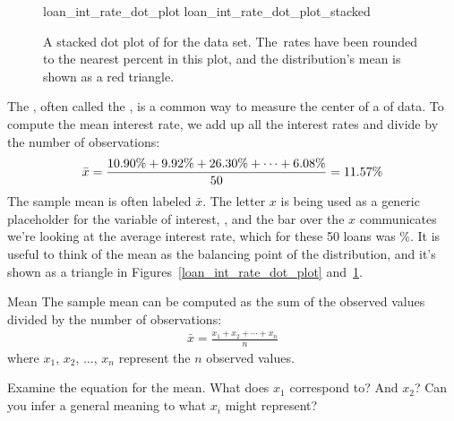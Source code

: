 \begin{figure}[h]
  \centering
      {loan_int_rate_dot_plot}
      {loan_int_rate_dot_plot_stacked}
  \caption{A stacked dot plot of
      for the  data set.
      The~rates have been rounded to the nearest
      percent in this plot, and the
      distribution's mean is shown as a red triangle.}
  \label{loan_int_rate_dot_plot_stacked}
\end{figure}

The , often called the
, is a common way
to measure the center of a \mbox{} of data.
To compute the mean interest rate, we add up all the interest
rates and divide by the number of observations:
\begin{align*}
\bar{x}
    = \frac{\text{10.90\%} + \text{9.92\%} + \text{26.30\%} +
        \cdots + \text{6.08\%}}{50{}}
    = 11.57{}\%
\end{align*}
The sample mean is often labeled $\bar{x}$.
The letter $x$ is being used as a generic placeholder
for the variable of interest, ,
and the bar over the $x$ communicates we're looking at the
average interest rate, which for these 50 loans was \loanAvg{}\%.
It is useful to think of the mean as the balancing point
of the distribution, and it's shown as a triangle in Figures~\ref{loan_int_rate_dot_plot}
and~\ref{loan_int_rate_dot_plot_stacked}.

\begin{onebox}{Mean}%
The sample mean can be computed as the sum of the
observed values divided by the number of observations:
\begin{align*}
\bar{x} = \frac{x_1 + x_2 + \cdots + x_n}{n}
\end{align*}
where $x_1$, $x_2$, $\dots$, $x_n$ represent
the $n$ observed values.
\end{onebox}

\begin{exercisewrap}
\begin{nexercise}
Examine the equation for the mean.
What does $x_1$ correspond to? And $x_2$?
Can you infer a general meaning to what $x_i$
might represent?\footnotemark{}
\end{nexercise}
\end{exercisewrap}

